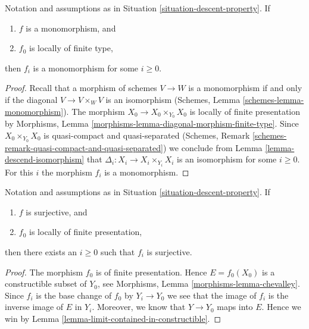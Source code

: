 \begin{lemma}
\label{lemma-descend-monomorphism}
Notation and assumptions as in Situation \ref{situation-descent-property}.
If
\begin{enumerate}
\item $f$ is a monomorphism, and
\item $f_0$ is locally of finite type,
\end{enumerate}
then $f_i$ is a monomorphism for some $i \geq 0$.
\end{lemma}

\begin{proof}
Recall that a morphism of schemes $V \to W$ is a monomorphism if and
only if the diagonal $V \to V \times_W V$ is an isomorphism
(Schemes, Lemma \ref{schemes-lemma-monomorphism}).
The morphism $X_0 \to X_0 \times_{Y_0} X_0$ is locally of finite
presentation by
Morphisms, Lemma \ref{morphisms-lemma-diagonal-morphism-finite-type}.
Since $X_0 \times_{Y_0} X_0$ is quasi-compact and quasi-separated
(Schemes, Remark \ref{schemes-remark-quasi-compact-and-quasi-separated})
we conclude from
Lemma \ref{lemma-descend-isomorphism}
that $\Delta_i : X_i \to X_i \times_{Y_i} X_i$ is an isomorphism for
some $i \geq 0$. For this $i$ the morphism $f_i$ is a monomorphism.
\end{proof}

\begin{lemma}
\label{lemma-descend-surjective}
Notation and assumptions as in Situation \ref{situation-descent-property}.
If
\begin{enumerate}
\item $f$ is surjective, and
\item $f_0$ is locally of finite presentation,
\end{enumerate}
then there exists an $i \geq 0$ such that $f_i$ is surjective.
\end{lemma}

\begin{proof}
The morphism $f_0$ is of finite presentation.
Hence $E = f_0(X_0)$ is a constructible subset of $Y_0$, see
Morphisms, Lemma \ref{morphisms-lemma-chevalley}.
Since $f_i$ is the base change of $f_0$ by
$Y_i \to Y_0$ we see that the image of $f_i$ is the
inverse image of $E$ in $Y_i$. Moreover, we know that
$Y \to Y_0$ maps into $E$. Hence we win by
Lemma \ref{lemma-limit-contained-in-constructible}.
\end{proof}







